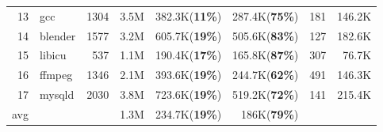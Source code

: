 \begin{table}[t]
{\begin{tabular}{r|lr|rrr|rr}
13  & gcc        & 1304 & 3.5M   & 382.3K(\textbf{11\%}) & 287.4K(\textbf{75\%})  & 181                       & 146.2K  \\
14  & blender    & 1577 & 3.2M   & 605.7K(\textbf{19\%}) & 505.6K(\textbf{83\%})  & 127                       & 182.6K  \\ \hline
15  & libicu     & 537  & 1.1M   & 190.4K(\textbf{17\%}) & 165.8K(\textbf{87\%})  & 307                       & 76.7K   \\
16  & ffmpeg     & 1346 & 2.1M   & 393.6K(\textbf{19\%}) & 244.7K(\textbf{62\%})  & 491                       & 146.3K  \\
17  & mysqld     & 2030 & 3.8M   & 723.6K(\textbf{19\%}) & 519.2K(\textbf{72\%})  & 141                       & 215.4K  \\ \hline
avg &            &      & 1.3M   & 234.7K(\textbf{19\%}) & 186K(\textbf{79\%})  &                           &         \\ \hline
\end{tabular}

}
\end{table}
